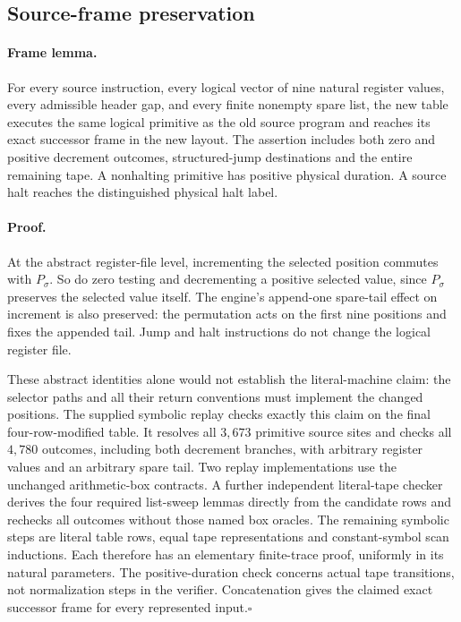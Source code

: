 \subsection{Source-frame preservation}

\paragraph{Frame lemma.}
For every source instruction, every logical vector of nine natural
register values, every admissible header gap, and every finite nonempty
spare list, the new table executes the same logical primitive as the old
source program and reaches its exact successor frame in the new layout.
The assertion includes both zero and positive decrement outcomes,
structured-jump destinations and the entire remaining tape.  A nonhalting
primitive has positive physical duration.  A source halt reaches the
distinguished physical halt label.

\paragraph{Proof.}
At the abstract register-file level, incrementing the selected position
commutes with $P_\sigma$.  So do zero testing and decrementing a positive
selected value, since $P_\sigma$ preserves the selected value itself.
The engine's append-one spare-tail effect on increment is also preserved:
the permutation acts on the first nine positions and fixes the appended
tail.  Jump and halt instructions do not change the logical register file.

These abstract identities alone would not establish the literal-machine
claim: the selector paths and all their return conventions must implement
the changed positions.  The supplied symbolic replay checks exactly this
claim on the final four-row-modified table.  It resolves all $3,673$
primitive source sites and checks all $4,780$ outcomes, including both
decrement branches, with arbitrary register values and an arbitrary spare
tail.  Two replay implementations use the unchanged arithmetic-box
contracts. A further independent literal-tape checker derives the four
required list-sweep lemmas directly from the candidate rows and rechecks
all outcomes without those named box oracles. The remaining symbolic steps are literal table rows,
equal tape representations and constant-symbol scan inductions.  Each
therefore has an elementary finite-trace proof, uniformly in its natural
parameters.  The positive-duration check concerns actual tape transitions,
not normalization steps in the verifier.  Concatenation gives the claimed
exact successor frame for every represented input.\hfill$\square$

